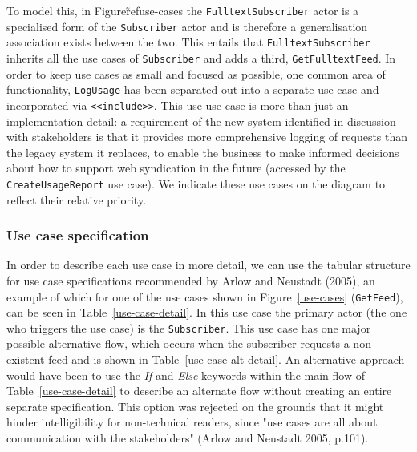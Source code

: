 \documentclass{article}
\begin{document}
To model this, in Figure\~ref{use-cases} the \texttt{FulltextSubscriber} actor is a specialised form of the \texttt{Subscriber} actor and is therefore a generalisation association exists between the two. This entails that \texttt{FulltextSubscriber} inherits all the use cases of \texttt{Subscriber} and adds a third, \texttt{GetFulltextFeed}. In order to keep use cases as small and focused as possible, one common area of functionality, \texttt{LogUsage} has been separated out into a separate use case and incorporated via \texttt{<<include>>}. This use use case is more than just an implementation detail: a requirement of the new system identified in discussion with stakeholders is that it provides more comprehensive logging of requests than the legacy system it replaces, to enable the business to make informed decisions about how to support web syndication in the future (accessed by the \texttt{CreateUsageReport} use case). We indicate these use cases on the diagram to reflect their relative priority.

\subsubsection{Use case specification}

In order to describe each use case in more detail, we can use the tabular structure for use case specifications recommended by Arlow and Neustadt (2005), an example of which for one of the use cases shown in Figure~\ref{use-cases} (\texttt{GetFeed}), can be seen in Table~\ref{use-case-detail}. In this use case the primary actor (the one who triggers the use case) is the \texttt{Subscriber}. This use case has one major possible alternative flow, which occurs when the subscriber requests a non-existent feed and is shown in Table~\ref{use-case-alt-detail}. An alternative approach would have been to use the \textit{If} and \textit{Else} keywords within the main flow of Table~\ref{use-case-detail} to describe an alternate flow without creating an entire separate specification. This option was rejected on the grounds that it might hinder intelligibility for non-technical readers, since "use cases are all about communication with the stakeholders" (Arlow and Neustadt 2005, p.101).

\end{document}
